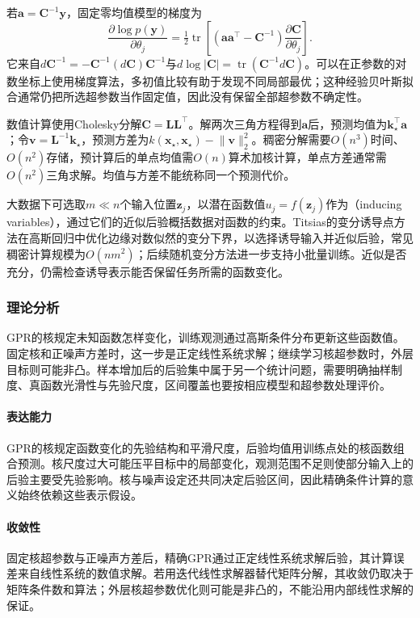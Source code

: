 若$\bm{a}=\bm{C}^{-1}\bm{y}$，固定零均值模型的梯度为
\[
  \frac{\partial\log p(\bm{y})}{\partial\theta_j}
  =\tfrac12\operatorname{tr}\!\left[
    (\bm{a}\bm{a}^{\top}-\bm{C}^{-1})
    \frac{\partial\bm{C}}{\partial\theta_j}\right].
\]
它来自$d\bm{C}^{-1}=-\bm{C}^{-1}(d\bm{C})\bm{C}^{-1}$与$d\log|\bm{C}|=\operatorname{tr}(\bm{C}^{-1}d\bm{C})$。可以在正参数的对数坐标上使用梯度算法，多初值比较有助于发现不同局部最优；这种经验贝叶斯拟合通常仍把所选超参数当作固定值，因此没有保留全部超参数不确定性。

数值计算使用Cholesky分解$\bm{C}=\bm{L}\bm{L}^{\top}$。解两次三角方程得到$\bm{a}$后，预测均值为$\bm{k}_{\star}^{\top}\bm{a}$；令$\bm{v}=\bm{L}^{-1}\bm{k}_{\star}$，预测方差为$k(\bm{x}_{\star},\bm{x}_{\star})-\lVert\bm{v}\rVert_2^2$。稠密分解需要$O(n^3)$时间、$O(n^2)$存储，预计算后的单点均值需$O(n)$算术加核计算，单点方差通常需$O(n^2)$三角求解。均值与方差不能统称同一个预测代价。

大数据下可选取$m\ll n$个输入位置$\bm{z}_j$，以潜在函数值$u_j=f(\bm{z}_j)$作为（inducing variables），通过它们的近似后验概括数据对函数的约束。Titsias的变分诱导点方法在高斯回归中优化边缘对数似然的变分下界，以选择诱导输入并近似后验，常见稠密计算规模为$O(nm^2)$；后续随机变分方法进一步支持小批量训练。近似是否充分，仍需检查诱导表示能否保留任务所需的函数变化。

\subsubsection{理论分析}
\label{sec:regression-gpr-theory}

GPR的核规定未知函数怎样变化，训练观测通过高斯条件分布更新这些函数值。固定核和正噪声方差时，这一步是正定线性系统求解；继续学习核超参数时，外层目标则可能非凸。样本增加后的后验集中属于另一个统计问题，需要明确抽样制度、真函数光滑性与先验尺度，区间覆盖也要按相应模型和超参数处理评价。

\paragraph{表达能力}
GPR的核规定函数变化的先验结构和平滑尺度，后验均值用训练点处的核函数组合预测。核尺度过大可能压平目标中的局部变化，观测范围不足则使部分输入上的后验主要受先验影响。核与噪声设定还共同决定后验区间，因此精确条件计算的意义始终依赖这些表示假设。

\paragraph{收敛性}
固定核超参数与正噪声方差后，精确GPR通过正定线性系统求解后验，其计算误差来自线性系统的数值求解。若用迭代线性求解器替代矩阵分解，其收敛仍取决于矩阵条件数和算法；外层核超参数优化则可能是非凸的，不能沿用内部线性求解的保证。

